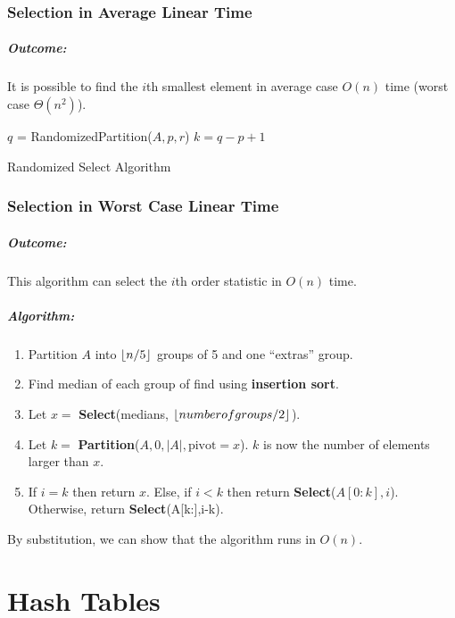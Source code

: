 \documentclass[a4paper,12pt]{report}
\DeclarePairedDelimiter{\floor}{\lfloor}{\rfloor}
\begin{document}
\subsection{Selection in Average Linear Time}

\paragraph{Outcome: } It is possible to find the $i$th smallest element in average case $O(n)$ time (worst case $\Theta(n^2)$).

\begin{algorithm}[H]
\SetAlgoLined
{}
	\BlankLine
	\BlankLine

	$q$ = RandomizedPartition($A,p,r$)\;
	$k = q-p+1$\;
	
	\caption{Randomized Select Algorithm}
\end{algorithm}

\subsection{Selection in Worst Case Linear Time}

\paragraph{Outcome: } This algorithm can select the $i$th order statistic in $O(n)$ time.

\paragraph{Algorithm: } 
\begin{enumerate}
\item Partition $A$ into $\floor{n/5}$ groups of 5 and one ``extras'' group.
\item Find median of each group of find using \textbf{insertion sort}.
\item Let $x = $ \textbf{Select}(medians, $\floor{number of groups/2}$).
\item Let $k = $ \textbf{Partition}($A, 0, |A|, \text{pivot}=x$). $k$ is now the number of elements larger than $x$.
\item If $i=k$ then return $x$. Else, if $i < k$ then return \textbf{Select}($A[0:k],i$). Otherwise, return \textbf{Select}(A[k:],i-k).
\end{enumerate}


By substitution, we can show that the algorithm runs in $O(n)$.











\chapter{Hash Tables}
\end{document}
